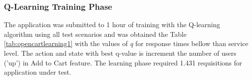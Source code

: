 \documentclass{report}
\begin{document}
\subsubsection{Q-Learning Training Phase}

The application was submitted to 1 hour of training with the  Q-learning algorithm using all test scenarios  and was obtained the Table \ref{tab:opencartlearning1} with the values of \textit{q}  for response times bellow than service level. The action and state with best q-value is increment the number of users ('up') in Add to Cart feature. The learning phase required 1.431 requisitions for application under test. 


\end{document}
